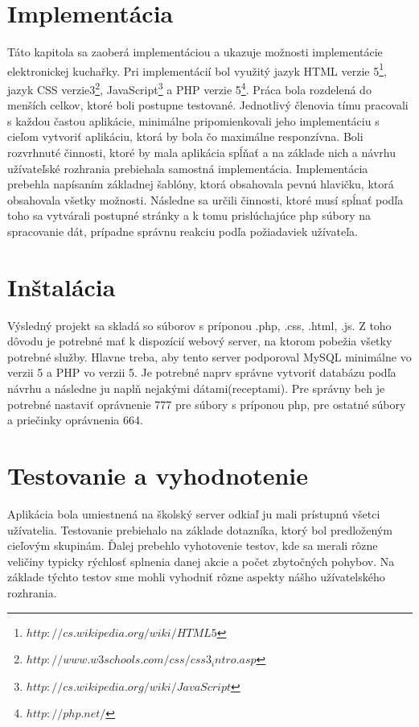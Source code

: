 \documentclass[12pt,a4paper,titlepage,final]{article}
\begin{document}
\section{Implementácia}
Táto kapitola sa zaoberá implementáciou a ukazuje možnosti implementácie elektronickej kuchařky. Pri implementácií bol využitý jazyk HTML verzie 5\footnote{$http://cs.wikipedia.org/wiki/HTML5$}, jazyk CSS verzie3\footnote{$http://www.w3schools.com/css/css3_intro.asp$}, JavaScript\footnote{$http://cs.wikipedia.org/wiki/JavaScript$} a PHP verzie 5\footnote{$http://php.net/$}. Práca bola rozdelená do menších celkov, ktoré boli postupne testované. Jednotlivý členovia tímu pracovali s každou častou aplikácie, minimálne pripomienkovali jeho implementáciu s cieľom vytvoriť aplikáciu, ktorá by bola čo maximálne responzívna. Boli rozvrhnuté činnosti, ktoré by mala aplikácia spĺňať a na základe nich a návrhu užívateľské rozhrania prebiehala samostná implementácia. Implementácia prebehla napísaním základnej šablóny, ktorá obsahovala pevnú hlavičku, ktorá obsahovala všetky možnosti. Následne sa určili činnosti, ktoré musí spĺnať podľa toho sa vytvárali postupné stránky a k tomu prislúchajúce php súbory na spracovanie dát, prípadne správnu reakciu podľa požiadaviek užívateľa.\cite{Prokop:Algoritmy}


\section{Inštalácia}
Výsledný projekt sa skladá so súborov s príponou .php, .css, .html, .js. Z toho dôvodu je potrebné mať k dispozícií webový server, na ktorom pobežia všetky potrebné služby. Hlavne treba, aby tento server podporoval MySQL minimálne vo verzii 5 a PHP vo verzii 5. Je potrebné naprv správne vytvoriť databázu podľa návrhu a následne ju naplň nejakými dátami(receptami). Pre správny beh je potrebné nastaviť oprávnenie 777 pre súbory s príponou php, pre ostatné súbory a priečinky oprávnenia 664.

\section{Testovanie a vyhodnotenie}
Aplikácia bola umiestnená na školský server odkiaľ ju mali prístupnú všetci užívatelia. Testovanie prebiehalo na základe dotazníka, ktorý bol predloženým cieľovým skupinám. Ďalej prebehlo vyhotovenie testov, kde sa merali rôzne veličiny typicky rýchlosť splnenia danej akcie a počet zbytočných pohybov. Na základe týchto testov sme mohli vyhodniť rôzne aspekty nášho užívatelského rozhrania. 
\end{document}

